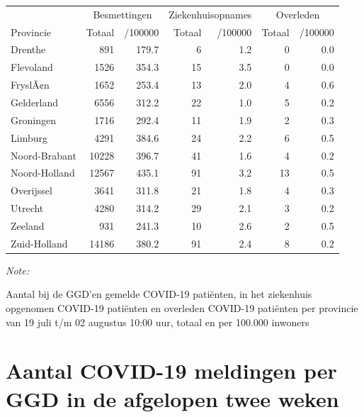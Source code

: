 \documentclass[
  english,
  man,floatsintext]{apa6}
\begin{document}
\begin{table}
\centering
\begin{threeparttable}
\begin{tabular}{lrrrrrr}
\toprule
\multicolumn{1}{c}{ } & \multicolumn{2}{c}{Besmettingen} & \multicolumn{2}{c}{Ziekenhuisopnames} & \multicolumn{2}{c}{Overleden} \\
\cmidrule(l{3pt}r{3pt}){2-3} \cmidrule(l{3pt}r{3pt}){4-5} \cmidrule(l{3pt}r{3pt}){6-7}
Provincie & Totaal & /100000 & Totaal & /100000 & Totaal & /100000\\
\midrule
Drenthe & 891 & 179.7 & 6 & 1.2 & 0 & 0.0\\
Flevoland & 1526 & 354.3 & 15 & 3.5 & 0 & 0.0\\
FryslÃ¢n & 1652 & 253.4 & 13 & 2.0 & 4 & 0.6\\
Gelderland & 6556 & 312.2 & 22 & 1.0 & 5 & 0.2\\
Groningen & 1716 & 292.4 & 11 & 1.9 & 2 & 0.3\\
Limburg & 4291 & 384.6 & 24 & 2.2 & 6 & 0.5\\
Noord-Brabant & 10228 & 396.7 & 41 & 1.6 & 4 & 0.2\\
Noord-Holland & 12567 & 435.1 & 91 & 3.2 & 13 & 0.5\\
Overijssel & 3641 & 311.8 & 21 & 1.8 & 4 & 0.3\\
Utrecht & 4280 & 314.2 & 29 & 2.1 & 3 & 0.2\\
Zeeland & 931 & 241.3 & 10 & 2.6 & 2 & 0.5\\
Zuid-Holland & 14186 & 380.2 & 91 & 2.4 & 8 & 0.2\\
\bottomrule
\end{tabular}
\begin{tablenotes}
\item \textit{Note: } 
\item Aantal bij de GGD’en gemelde COVID-19 patiënten, in het ziekenhuis opgenomen COVID-19 patiënten en overleden COVID-19 patiënten per provincie van 19 juli t/m 02 augustus 10:00 uur, totaal en per 100.000 inwoners
\end{tablenotes}
\end{threeparttable}
\end{table}

\newpage

\hypertarget{aantal-covid-19-meldingen-per-ggd-in-de-afgelopen-twee-weken}{%
\section{Aantal COVID-19 meldingen per GGD in de afgelopen twee weken}\label{aantal-covid-19-meldingen-per-ggd-in-de-afgelopen-twee-weken}}
\end{document}
